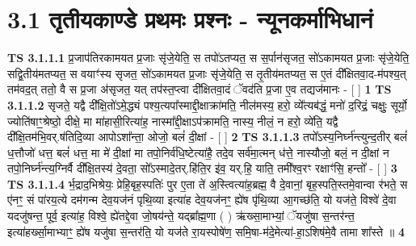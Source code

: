 \documentclass[17pt]{extarticle}
\begin{document}
     \section*{ 3.1     तृतीयकाण्डे प्रथमः प्रश्नः - न्यूनकर्माभिधानं }
                                        \textbf{ TS 3.1.1.1} \newline
                  प्र॒जाप॑तिरकामयत प्र॒जाः सृ॑जे॒येति॒ स तपो॑ऽतप्यत॒ स स॒र्पान॑सृजत॒ सो॑ऽकामयत प्र॒जाः सृ॑जे॒येति॒ सद्वि॒तीय॑मतप्यत॒ स वयाꣳ॑स्य सृजत॒ सो॑ऽकामयत प्र॒जाः सृ॑जे॒येति॒ स तृ॒तीय॑मतप्यत॒ स ए॒तं दी᳚क्षितवा॒द-म॑पश्य॒त् तम॑वद॒त् ततो॒ वै स प्र॒जा अ॑सृजत॒ यत् तप॑स्त॒प्त्वा दी᳚क्षितवा॒दं ॅवद॑ति प्र॒जा ए॒व तद्यज॑मानः - [  ] \textbf{  1} \newline
                  \newline
                                \textbf{ TS 3.1.1.2} \newline
                  सृजते॒ यद्वै दी᳚क्षि॒तो॑ऽमे॒द्ध्यं पश्य॒त्यपा᳚स्माद्दी॒क्षाक्रा॑मति॒ नील॑मस्य॒ हरो॒ व्ये᳚त्यब॑द्धं॒ मनो॑ द॒रिद्रं॒ चक्षुः॒ सूर्यो॒ ज्योति॑षाꣳ॒॒श्रेष्ठो॒ दीक्षे॒ मा मा॑हासी॒रित्या॑ह॒ नास्मा᳚द्दी॒क्षाऽप॑क्रामति॒ नास्य॒ नीलं॒ न हरो॒ व्ये॑ति॒ यद्वै दी᳚क्षि॒तम॑भि॒वर्.ष॑तिदि॒व्या आपोऽशा᳚न्ता॒ ओजो॒ बलं॑ दी॒क्षां - [  ] \textbf{  2} \newline
                  \newline
                                \textbf{ TS 3.1.1.3} \newline
                  तपो᳚ऽस्य॒निर्घ्न॑न्त्युन्द॒तीर् बलं॑ ध॒त्तौजो॑ धत्त॒ बलं॑ धत्त॒ मा मे॑ दी॒क्षां मा तपो॒निर्व॑धि॒ष्टेत्या॑है॒ तदे॒व सर्व॑मा॒त्मन् ध॑त्ते॒ नास्यौजो॒ बलं॒ न दी॒क्षां न तपो॒निर्घ्न॑न्त्य॒ग्निर्वै दी᳚क्षि॒तस्य॑ दे॒वता॒ सो᳚ऽस्मादे॒तर्.हि॑ति॒र इ॑व॒ यर्.हि॒ याति॒ तमी᳚श्व॒रꣳ रक्षाꣳ॑सि॒ हन्तो᳚ -  [  ] \textbf{  3} \newline
                  \newline
                                \textbf{ TS 3.1.1.4} \newline
                  र्भ॒द्राद॒भिश्रेयः॒ प्रेहि॒बृह॒स्पतिः॑ पुर ए॒ता ते॑ अ॒स्त्वित्या॑ह॒ब्रह्म॒ वै दे॒वानां॒ बृह॒स्पति॒स्तमे॒वान्वा र॑भते॒ स ए॑नꣳ॒॒ सं पा॑रय॒त्ये दम॑गन्म देव॒यज॑नं पृथि॒व्या इत्या॑ह देव॒यज॑नꣳ॒॒ ह्ये॑ष पृ॑थि॒व्या आ॒गच्छ॑ति॒ यो यज॑ते॒ विश्वे॑ दे॒वा यदजु॑षन्त॒ पूर्व॒ इत्या॑ह॒ विश्वे॒ ह्ये॑तद्दे॒वा जो॒षय॑न्ते॒ यद्ब्रा᳚ह्म॒णा ( ) ऋ॑ख्सा॒माभ्यां॒ ॅयजु॑षा स॒न्तर॑न्त॒ इत्या॑हर्ख्सा॒माभ्याꣳ॒॒ ह्ये॑ष यजु॑षा स॒न्तर॑ति॒ यो यज॑ते रा॒यस्पोषे॑ण॒ समि॒षा-म॑दे॒मेत्या॑-हा॒ऽशिष॑मे॒वै तामा शा᳚स्ते ॥ \textbf{  4} \newline
                  \newline
\end{document}
